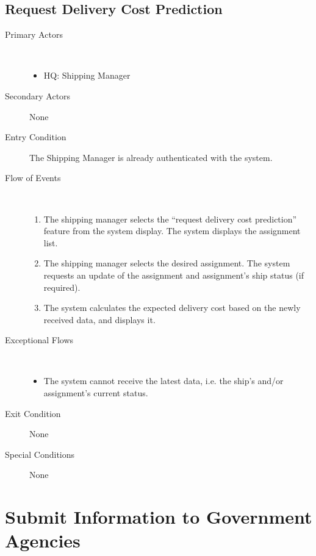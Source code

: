 \documentclass[a4paper,10pt]{report}
\begin{document}
\section{Request Delivery Cost Prediction}
\begin{description}
\item[Primary Actors] \
  \begin{itemize}
  \item HQ: Shipping Manager
  \end{itemize}
\item[Secondary Actors] None
\item[Entry Condition]
  The Shipping Manager is already authenticated with the system.
\item[Flow of Events] \
  \begin{enumerate}
    \item The shipping manager selects the ``request delivery cost prediction'' feature from the system display. The system displays the assignment list.
    \item The shipping manager selects the desired assignment. The system requests an update of the assignment and assignment's ship status (if required).
    \item The system calculates the expected delivery cost based on the newly received data, and displays it.
  \end{enumerate}
\item[Exceptional Flows] \
  \begin{itemize}
  \item The system cannot receive the latest data, i.e. the ship's and/or assignment's current status.
  \end{itemize}
\item[Exit Condition] None
\item[Special Conditions] None
\end{description}


\chapter{Submit Information to Government Agencies}
\end{document}
